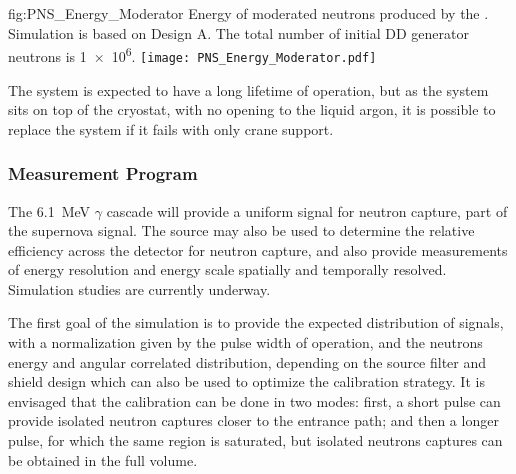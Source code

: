 \begin{dunefigure}{fig:PNS_Energy_Moderator}
{Energy of moderated neutrons produced by the . Simulation is based on Design A. The total number of initial DD generator neutrons is \num{1e6}. }
\texttt{[image: PNS\_Energy\_Moderator.pdf]}
\end{dunefigure}

The system is expected to have a long lifetime of operation, but as the  system sits on top of the cryostat, with no opening to the liquid argon, it is possible to replace the system if it fails with only crane support.


\subsubsection{Measurement Program}
\label{sec:sp-calib-sys-pns-meas}

The \SI{6.1}{\MeV} $\gamma$ cascade will provide a uniform signal for neutron capture, part of the supernova signal. The source may also be used to determine the relative efficiency across the detector for neutron capture, and also provide measurements of energy resolution and energy scale spatially and temporally resolved. Simulation studies are currently underway.


The first goal of the simulation is to provide the expected distribution of signals, with a normalization given by the pulse width of  operation, and the neutrons energy and angular correlated distribution, depending on the source filter and shield design which can also be used to optimize the calibration strategy.
It is envisaged that the calibration can be done in two modes: first, a short  pulse can provide isolated neutron captures closer to the entrance path; and then a longer  pulse, for which the same region is saturated, but isolated neutrons captures can be obtained in the full volume.

